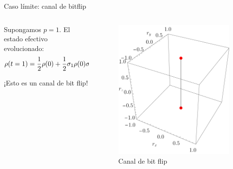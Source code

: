 \begin{frame}{Caso límite: canal de bitflip}
    \begin{columns}
        \begin{column}{0.5\textwidth}
            Supongamos $p=1$. El estado efectivo evolucionado:
            \begin{equation*}
              \rho(t=1)=\frac{1}{2}\rho(0)+\frac{1}{2}\sigma_{1}\rho(0)\sigma_{1}.
            \end{equation*}\pause
        
            ¡Esto es un canal de bit flip!\pause
        \end{column}
        \begin{column}{0.5\textwidth}
            \begin{figure}[h!]
                \centering
                \includegraphics[width=0.7\linewidth]{figures/maxent_results/CNOT_p=1._t=1_r=0.9.png}
                \caption{Canal de bit flip}
                \label{fig:SWAPFactor2D}
              \end{figure}
        \end{column}
    \end{columns}
\end{frame}
